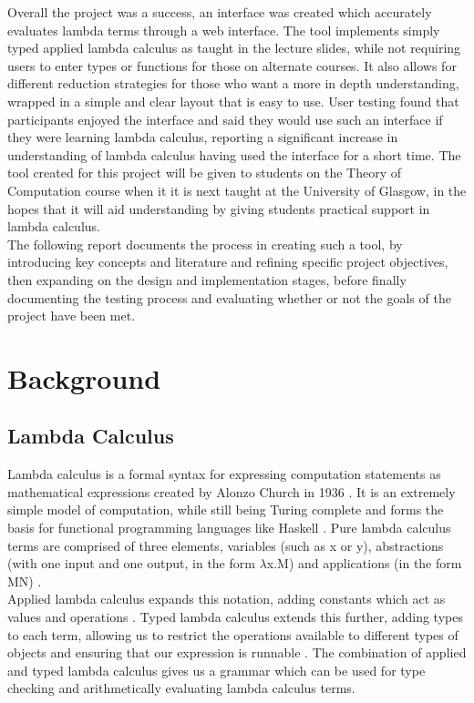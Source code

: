 \documentclass[a4paper,11pt]{report}
\begin{document}
Overall the project was a success, an interface was created which accurately evaluates lambda terms through a web interface. The tool implements simply typed applied lambda calculus as taught in the lecture slides, while not requiring users to enter types or functions for those on alternate courses. It also allows for different reduction strategies for those who want a more in depth understanding, wrapped in a simple and clear layout that is easy to use. User testing found that participants enjoyed the interface and said they would use such an interface if they were learning lambda calculus, reporting a significant increase in understanding of lambda calculus having used the interface for a short time. The tool created for this project will be given to students on the Theory of Computation course when it it is next taught at the University of Glasgow, in the hopes that it will aid understanding by giving students practical support in lambda calculus.\\

The following report documents the process in creating such a tool, by introducing key concepts and literature and refining specific project objectives, then expanding on the design and implementation stages, before finally documenting the testing process and evaluating whether or not the goals of the project have been met.\\

\chapter{Background}
\section{Lambda Calculus}

Lambda calculus is a formal syntax for expressing computation statements as mathematical expressions \cite{Selinger2013} created by Alonzo Church in 1936 \cite{Barendregt2000}. It is an extremely simple model of computation, while still being Turing complete \cite{Rojas1998} and forms the basis for functional programming languages like Haskell \cite{Barendregt2000}. Pure lambda calculus terms are comprised of three elements, variables (such as x or y), abstractions (with one input and one output, in the form $\lambda$x.M) and applications (in the form MN) \cite{Hankin2004}.\\

Applied lambda calculus expands this notation, adding constants which act as values and operations \cite{Slonneger1995}. Typed lambda calculus extends this further, adding types to each term, allowing us to restrict the operations available to different types of objects and ensuring that our expression is runnable \cite{Loader1998}. The combination of applied and typed lambda calculus gives us a grammar which can be used for type checking and arithmetically evaluating lambda calculus terms.\\
\end{document}
